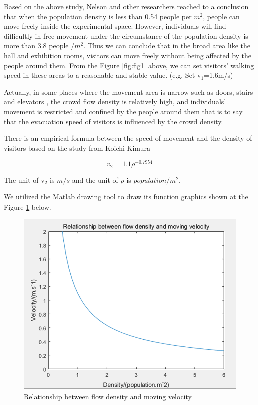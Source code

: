 \documentclass[12pt]{article}
\begin{document}
Based on the above study, Nelson and other researchers reached to 
a conclusion that when the population density is less than 0.54 people per 
$m^2$, people can move freely inside the experimental space. However, 
individuals will find difficultly in free movement under the circumstance 
of the population density is more than 3.8 people /$m^2$.\cite{8} Thus 
we can conclude that in the broad area like the hall and exhibition rooms, 
visitors can move freely without being affected by the people around them. 
From the Figure \ref{fig:fig1} above, we can set visitors' walking speed 
in these areas to a reasonable and stable value. (e.g. Set v$_{1}$=1.6m/s)

Actually, in some places where the movement area is narrow such as doors, 
stairs and elevators ,  the crowd flow density is relatively high, and 
individuals' movement is restricted and confined by the people around 
them that is to say that the evacuation speed of visitors is influenced 
by the crowd density.

There is an empirical formula between the speed of movement and the density of visitors based on the study from Koichi Kimura

\begin{equation}
    v_{2}=1.1\rho^{-0.7954}   
\end{equation}

The unit of  v$_{2}$  is $m/s$ and the unit of $\rho$ is $population/m^2$.

We utilized the Matlab drawing tool to draw its function graphics shown at the Figure \ref{fig:fig2} below.


\begin{figure}[htb] 
	\centering
	\includegraphics[scale=0.9]{figure7.png}
	\caption{Relationship between flow density and moving velocity}
	\label{fig:fig2}
\end{figure}
\end{document}
